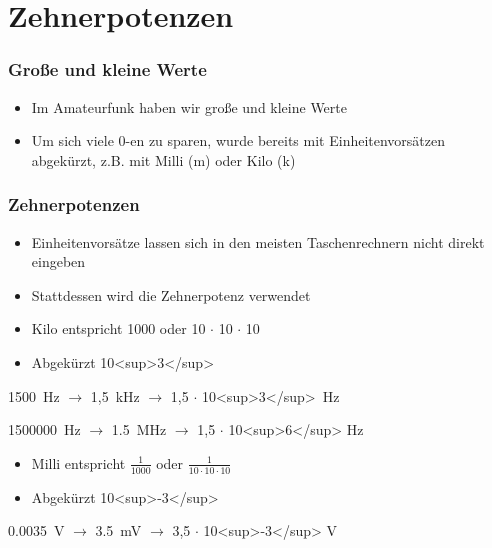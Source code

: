 
\section{Zehnerpotenzen}
\label{section:zehnerpotenzen}
\begin{frame}%

\frametitle{Große und kleine Werte}
\begin{itemize}
  \item Im Amateurfunk haben wir große und kleine Werte
  \item Um sich viele 0-en zu sparen, wurde bereits mit Einheitenvorsätzen abgekürzt, z.B. mit Milli (m) oder Kilo (k)
  \end{itemize}
\end{frame}

\begin{frame}
\frametitle{Zehnerpotenzen}
\begin{itemize}
  \item Einheitenvorsätze lassen sich in den meisten Taschenrechnern nicht direkt eingeben
  \item Stattdessen wird die Zehnerpotenz verwendet
  \item Kilo entspricht 1000 oder 10 $\cdot$ 10 $\cdot$ 10
  \item Abgekürzt 10<sup>3</sup>
  \end{itemize}
    \pause
    \qty{1500}{\hertz} $\rightarrow$ 1,5 kHz $\rightarrow$ 1,5 $\cdot$ 10<sup>3</sup> Hz

\qty{1500000}{\hertz} $\rightarrow$ \qty{1,5}{\mega\hertz} $\rightarrow$ 1,5 $\cdot$ 10<sup>6</sup> Hz

\end{frame}

\begin{frame}\begin{itemize}
  \item Milli entspricht  $\frac{1}{1000}$ oder $\frac{1}{10 \cdot 10 \cdot 10}$
  \item Abgekürzt 10<sup>-3</sup>
  \end{itemize}
    \pause
    \qty{0,0035}{\volt} $\rightarrow$ \qty{3,5}{\milli\volt} $\rightarrow$ 3,5 $\cdot$ 10<sup>-3</sup> V



\end{frame}

